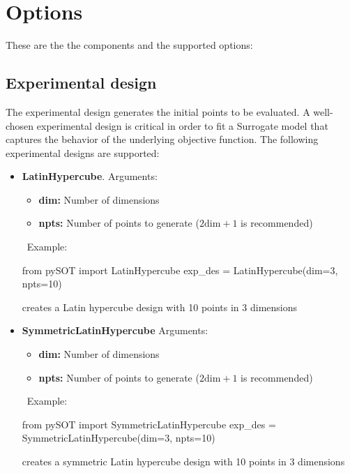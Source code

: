 \documentclass[]{article}
\begin{document}
\section{Options}
These are the the components and the supported options:
\subsection{Experimental design} 
\label{expdes}
The experimental design generates the initial points to be evaluated. A well-chosen experimental design is critical in order to fit a Surrogate model that captures the behavior of the underlying objective function. The following experimental designs are supported:
\begin{itemize}
\item \textbf{LatinHypercube}. Arguments:
\begin{itemize}
\item \textbf{dim:} Number of dimensions
\item \textbf{npts:} Number of points to generate ($2 \text{dim}+1$ is recommended)
\end{itemize} 
\ \newline Example: 
\begin{python}
from pySOT import LatinHypercube
exp_des = LatinHypercube(dim=3, npts=10)
\end{python}
creates a Latin hypercube design with 10 points in 3 dimensions
\item \textbf{SymmetricLatinHypercube} Arguments:
\begin{itemize}
\item \textbf{dim:} Number of dimensions
\item \textbf{npts:} Number of points to generate ($2 \text{dim}+1$ is recommended)
\end{itemize}
\ \newline Example: 
\begin{python}
from pySOT import SymmetricLatinHypercube
exp_des = SymmetricLatinHypercube(dim=3, npts=10)
\end{python}
creates a symmetric Latin hypercube design with 10 points in 3 dimensions

\end{itemize}
\end{document}
